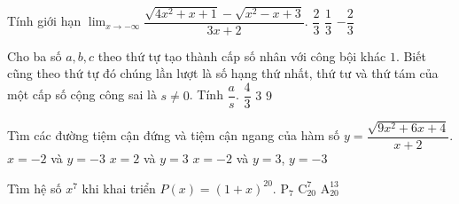 \begin{ex}%
Tính giới hạn $\displaystyle\lim_{x\rightarrow -\infty}\dfrac{\sqrt{4x^2+x+1}-\sqrt{x^2-x+3}}{3x+2}$.
{$\dfrac{2}{3}$}
{$\dfrac{1}{3}$}
{$-\dfrac{2}{3}$}
\end{ex}

\begin{ex}%
Cho ba số $a,b,c$ theo thứ tự tạo thành cấp số nhân với công bội khác $1$. Biết cũng theo thứ tự đó chúng lần lượt là số hạng thứ nhất, thứ tư và thứ tám của một cấp số cộng công sai là $s\neq 0$. Tính $\dfrac{a}{s}$.
{$\dfrac{4}{3}$}
{$3$}
{\True $9$}
\end{ex}

\begin{ex}%
Tìm các đường tiệm cận đứng và tiệm cận ngang của hàm số $y=\dfrac{\sqrt{9x^2+6x+4}}{x+2}$.
{$x=-2$ và $y=-3$}
{$x=2$ và $y=3$}
{\True $x=-2$ và $y=3$, $y=-3$}
\end{ex}

\begin{ex}%
Tìm hệ số $x^7$ khi khai triển $P(x)=(1+x)^{20}$.
{$\mathrm{P}_7$}
{\True $\mathrm{C}_{20}^{7}$}
{$\mathrm{A}_{20}^{13}$}
\end{ex}

